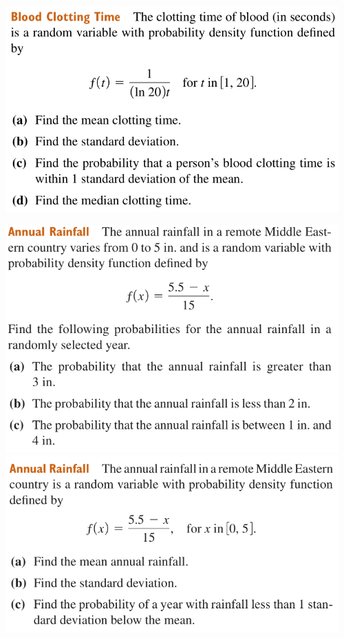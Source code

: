 \begin{enumerate}
\begin{center}
            \includegraphics[width=0.96\textwidth]{screenshots/blood2.png}
        \end{center}
        \newpage
        \begin{center}
            \includegraphics[width=0.96\textwidth]{screenshots/rainfall1.png}
            \includegraphics[width=0.96\textwidth]{screenshots/rainfall2.png}

\end{center}
\end{enumerate}
